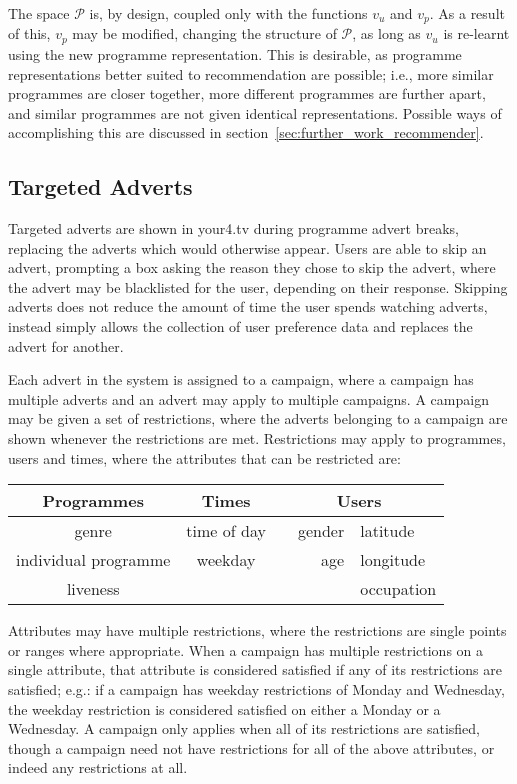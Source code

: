 The space $\mathcal{P}$ is, by design, coupled only with the functions $v_u$ and $v_p$. As a result of this, $v_p$ may be modified, changing the structure of $\mathcal{P}$, as long as $v_u$ is re-learnt using the new programme representation. This is desirable, as programme representations better suited to recommendation are possible; i.e., more similar programmes are closer together, more different programmes are further apart, and similar programmes are not given identical representations. Possible ways of accomplishing this are discussed in section~\ref{sec:further_work_recommender}.

\subsection{Targeted Adverts}
\label{sec:design_adverts}

Targeted adverts are shown in your4.tv during programme advert breaks, replacing the adverts which would otherwise appear. Users are able to skip an advert, prompting a box asking the reason they chose to skip the advert, where the advert may be blacklisted for the user, depending on their response. Skipping adverts does not reduce the amount of time the user spends watching adverts, instead simply allows the collection of user preference data and replaces the advert for another.

Each advert in the system is assigned to a campaign, where a campaign has multiple adverts and an advert may apply to multiple campaigns. A campaign may be given a set of restrictions, where the adverts belonging to a campaign are shown whenever the restrictions are met. Restrictions may apply to programmes, users and times, where the attributes that can be restricted are:

\begin{center}
	\begin{tabular}{c c r l}
		\toprule
		\textbf{Programmes} & \textbf{Times} & \multicolumn{2}{c}{\textbf{Users}} \\
		\midrule
		genre & time of day & ~~gender & latitude \\ %
		individual programme & weekday & age & longitude \\
		liveness & & &  occupation \\
		\bottomrule
	\end{tabular}
\end{center}

Attributes may have multiple restrictions, where the restrictions are single points or ranges where appropriate. When a campaign has multiple restrictions on a single attribute, that attribute is considered satisfied if any of its restrictions are satisfied; e.g.: if a campaign has weekday restrictions of Monday and Wednesday, the weekday restriction is considered satisfied on either a Monday or a Wednesday. A campaign only applies when all of its restrictions are satisfied, though a campaign need not have restrictions for all of the above attributes, or indeed any restrictions at all.

